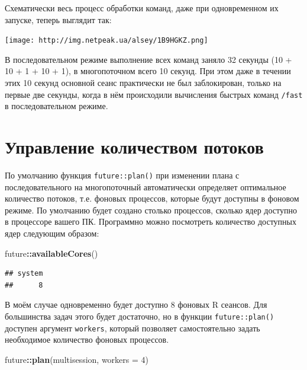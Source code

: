 \documentclass[
]{book}
\newenvironment{Shaded}{\begin{snugshade}}{\end{snugshade}}
\newcommand{\AttributeTok}[1]{\textcolor[rgb]{0.13,0.29,0.53}{#1}}
\newcommand{\DecValTok}[1]{\textcolor[rgb]{0.00,0.00,0.81}{#1}}
\newcommand{\FunctionTok}[1]{\textcolor[rgb]{0.13,0.29,0.53}{\textbf{#1}}}
\newcommand{\NormalTok}[1]{#1}
\newcommand{\SpecialCharTok}[1]{\textcolor[rgb]{0.81,0.36,0.00}{\textbf{#1}}}
\newcommand{\StringTok}[1]{\textcolor[rgb]{0.31,0.60,0.02}{#1}}
\begin{document}
Схематически весь процесс обработки команд, даже при одновременном их запуске, теперь выглядит так:

\texttt{[image: http://img.netpeak.ua/alsey/1B9HGKZ.png]}

В последовательном режиме выполнение всех команд заняло 32 секунды (10 + 10 + 1 + 10 + 1), в многопоточном всего 10 секунд. При этом даже в течении этих 10 секунд основной сеанс практически не был заблокирован, только на первые две секунды, когда в нём происходили вычисления быстрых команд \texttt{/fast} в последовательном режиме.

\section{Управление количеством потоков}\label{ux443ux43fux440ux430ux432ux43bux435ux43dux438ux435-ux43aux43eux43bux438ux447ux435ux441ux442ux432ux43eux43c-ux43fux43eux442ux43eux43aux43eux432}

По умолчанию функция \texttt{future::plan()} при изменении плана с последовательного на многопоточный автоматически определяет оптимальное количество потоков, т.е. фоновых процессов, которые будут доступны в фоновом режиме. По умолчанию будет создано столько процессов, сколько ядер доступно в процессоре вашего ПК. Программно можно посмотреть количество доступных ядер следующим образом:

\begin{Shaded}
\begin{Highlighting}[]
\NormalTok{future}\SpecialCharTok{::}\FunctionTok{availableCores}\NormalTok{()}
\end{Highlighting}
\end{Shaded}

\begin{verbatim}
## system 
##      8
\end{verbatim}

В моём случае одновременно будет доступно 8 фоновых R сеансов. Для большинства задач этого будет достаточно, но в функции \texttt{future::plan()} доступен аргумент \texttt{workers}, который позволяет самостоятельно задать необходимое количество фоновых процессов.

\begin{Shaded}
\begin{Highlighting}[]
\NormalTok{future}\SpecialCharTok{::}\FunctionTok{plan}\NormalTok{(}\StringTok{\textquotesingle{}multisession\textquotesingle{}}\NormalTok{, }\AttributeTok{workers =} \DecValTok{4}\NormalTok{)}
\end{Highlighting}
\end{Shaded}
\end{document}

